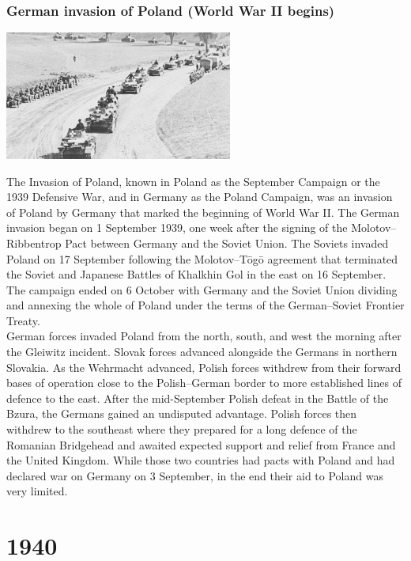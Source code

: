 \documentclass[11pt]{report}
\begin{document}
\subsection{German invasion of Poland (World War II begins)}
\vspace{2mm}\begin{center}\includegraphics[width=7.5cm]{./img/gerInvadesPol.jpg}\end{center}
The Invasion of Poland, known in Poland as the September Campaign or the 1939 Defensive War, and in Germany as the Poland Campaign, was an invasion of Poland by Germany that marked the beginning of World War II. The German invasion began on 1 September 1939, one week after the signing of the Molotov–Ribbentrop Pact between Germany and the Soviet Union. The Soviets invaded Poland on 17 September following the Molotov–Tōgō agreement that terminated the Soviet and Japanese Battles of Khalkhin Gol in the east on 16 September. The campaign ended on 6 October with Germany and the Soviet Union dividing and annexing the whole of Poland under the terms of the German–Soviet Frontier Treaty.\\
\indent German forces invaded Poland from the north, south, and west the morning after the Gleiwitz incident. Slovak forces advanced alongside the Germans in northern Slovakia. As the Wehrmacht advanced, Polish forces withdrew from their forward bases of operation close to the Polish–German border to more established lines of defence to the east. After the mid-September Polish defeat in the Battle of the Bzura, the Germans gained an undisputed advantage. Polish forces then withdrew to the southeast where they prepared for a long defence of the Romanian Bridgehead and awaited expected support and relief from France and the United Kingdom. While those two countries had pacts with Poland and had declared war on Germany on 3 September, in the end their aid to Poland was very limited.

\chapter{1940}
\end{document}
